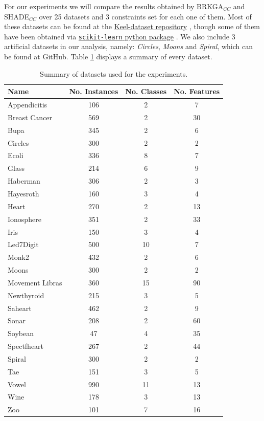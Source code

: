 \documentclass[review]{elsarticle}
\begin{document}
For our experiments we will compare the results obtained by BRKGA$_{CC}$ and SHADE$_{CC}$ over 25 datasets and 3 constraints set for each one of them. Most of these datasets can be found at the \href{https://sci2s.ugr.es/keel/category.php?cat=clas}{Keel-dataset repository} \cite{triguero2017keel}, though some of them have been obtained via
\href{https://scikit-learn.org/stable/datasets/index.html}{\texttt{scikit-learn} python package} \cite{scikit-learn}. We also include 3 artificial datasets in our analysis, namely: \textit{Circles}, \textit{Moons} and \textit{Spiral}, which can be found at GitHub. Table \ref{tab:datasets} displays a summary of every dataset.

\begin{table}[!h]
	\centering
	\small
	\begin{tabular}{l c c c}
		\hline
		Name & No. Instances & No. Classes & No. Features \\
		\hline
		Appendicitis & 106 & 2 & 7 \\
		Breast Cancer & 569 & 2 & 30 \\
		Bupa & 345 & 2 & 6 \\
		Circles & 300 & 2 & 2 \\
		Ecoli & 336 & 8 & 7 \\
		Glass & 214 & 6 & 9 \\
		Haberman & 306 & 2 & 3 \\
		Hayesroth & 160 & 3 & 4 \\
		Heart & 270 & 2 & 13 \\
		Ionosphere & 351 & 2 & 33 \\
		Iris & 150 & 3 & 4 \\
		Led7Digit & 500 & 10 & 7 \\
		Monk2 & 432 & 2 & 6 \\
		Moons & 300 & 2 & 2 \\
		Movement Libras & 360 & 15 & 90 \\
		Newthyroid & 215 & 3 & 5 \\
		Saheart & 462 & 2 & 9 \\
		Sonar & 208 & 2 & 60 \\
		Soybean & 47 & 4 & 35 \\
		Spectfheart & 267 & 2 & 44 \\
		Spiral & 300 & 2 & 2 \\
		Tae & 151 & 3 & 5 \\
		Vowel & 990 & 11 & 13 \\
		Wine & 178 & 3 & 13 \\
		Zoo & 101 & 7 & 16 \\
		\hline

	\end{tabular}%
	\caption{Summary of datasets used for the experiments.}
	\label{tab:datasets}
\end{table}
\end{document}
